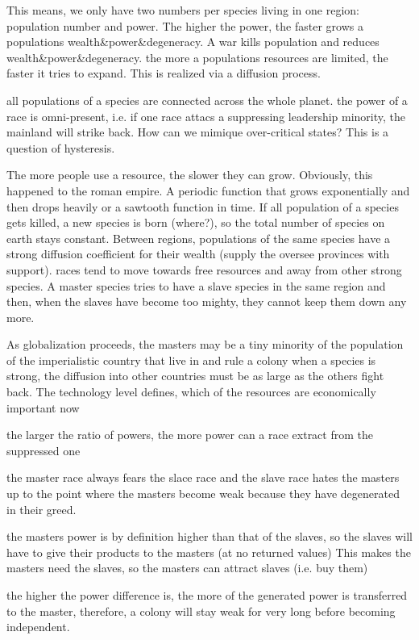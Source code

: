 \documentclass[12pt]{article}
\begin{document}
This means, we only have two numbers per species living in one region:
population number and power. The higher the power, the faster grows
a populations wealth\&power\&degeneracy.
A war kills population and reduces wealth\&power\&degeneracy.
the more a populations resources are limited, the faster it tries to
expand. This is realized via a diffusion process.

all populations of a species are connected across the whole planet.
the power of a race is omni-present, i.e. if one race attacs a suppressing
leadership minority, the mainland will strike back.
How can we mimique over-critical states? This is a question of hysteresis.

The more people use a resource, the slower they can grow.
Obviously, this happened to the roman empire.
A periodic function that grows exponentially and then drops heavily or
a sawtooth function in time. 
If all population of a species gets killed, a new species is born (where?), so the
total number of species on earth stays constant.
Between regions, populations of the same species have a strong diffusion
coefficient for their wealth (supply the oversee provinces with support).
races tend to move towards free resources and away from other strong species.
A master species tries to have a slave species in the same region
and then, when the slaves have become too mighty, they cannot keep
them down any more.

As globalization proceeds, the masters may be a tiny minority
of the population of the imperialistic country that live in and rule
a colony
when a species is strong, the diffusion into other countries must be
as large as the others fight back.
The technology level defines, which of the resources are economically
important now

the larger the ratio of powers, the more power can a race extract from
the suppressed one

the master race always fears the slace race and the slave race hates the masters
up to the point where the masters become weak because they have
degenerated in their greed.

the masters power is by definition higher than that of the slaves,
so the slaves will have to give their products to the masters (at no returned values)
This makes the masters need the slaves, so the masters can attract slaves (i.e. buy them)

the higher the power difference is, the more of the generated power is transferred to
the master, therefore, a colony will stay weak for very long before becoming independent.
\end{document}

